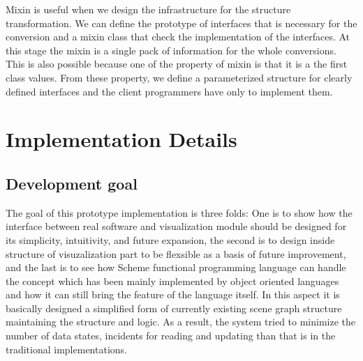 \documentclass[preprint,nocopyrightspace]{sigplanconf}
\begin{document}
Mixin is useful when we design the infrastructure for the structure transformation. We can define the prototype of interfaces that is necessary for the conversion and a mixin class that check the implementation of the interfaces. At this stage the mixin is a single pack of information for the whole conversions. This is also possible because one of the property of mixin is that it is a the first class values. From these property, we define a parameterized structure for clearly defined interfaces and the client programmers have only to implement them.

\section{Implementation Details}
\subsection{Development goal}

The goal of this prototype implementation is three folds: One is to show how the interface between real software and visualization module should be designed for its simplicity, intuitivity, and future expansion, the second is to design inside structure of visuzalization part to be flexsible as a basis of future improvement, and the last is to see how Scheme functional programming language can handle the concept which has been mainly implemented by object oriented languages and how it can still bring the feature of the language itself.  In this aspect it is basically designed a simplified form of currently existing scene graph structure maintaining the structure and logic. As a result, the system tried to minimize the number of data states, incidents for reading and updating than that is in the traditional implementations.
  
\end{document}
